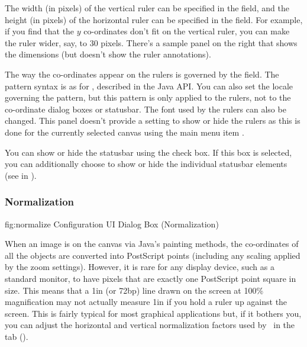 The width (in pixels) of the vertical ruler can be specified in the
 field, and the height (in pixels) of
the horizontal ruler can be specified in the
 field. For example, if you find that
the $y$ co-ordinates don't fit on the vertical ruler, you can make the
ruler wider, say, to 30 pixels. There's a sample panel on the right
that shows the dimensions (but doesn't show the ruler annotations).

The way the co-ordinates appear on the rulers is governed by the
 field.  The pattern syntax is as for
\href{https://docs.oracle.com/javase/8/docs/api/java/text/DecimalFormat.html}{},
described in the Java API.  You can also set the locale governing
the pattern, but this pattern is only applied to the \glspl{ruler},
not to the co-ordinate dialog boxes or \gls{statusbar}. The font
used by the rulers can also be changed.  This panel doesn't provide
a setting to show or hide the rulers as this is done for the
currently selected \gls{canvas} using the main menu item
.


You can show or hide the \gls{statusbar} using the
 check box. If this box is
selected, you can additionally choose to show or hide the
individual \gls{statusbar} elements (see 
in ).


\subsubsection{Normalization}\label{sec:normalize}


\FloatFig
  {fig:normalize}
  {}
  {Configuration UI Dialog Box (Normalization)}

When an image is  on the \gls{canvas} via Java's painting
methods, the co-ordinates of all the objects are converted into
PostScript points (including any scaling applied by the zoom
settings). However, it is rare for any display device, such as a
standard monitor, to have pixels that are exactly one PostScript point square
in size. This means that a 1in (or 72\gls{bp}) line drawn on the
screen at 100\% magnification may not actually measure 1in if you
hold a ruler up against the screen. This is fairly typical for
most graphical applications but, if it bothers you, you can
adjust the horizontal and vertical normalization factors used by
\FlowframTk\ in the  tab
().

